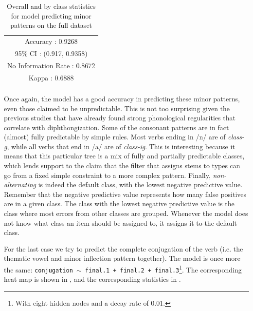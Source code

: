 \begin{table}
    \small
  \centering
  \begin{tabular}{lrrrrrr}
    \lsptoprule
    \multicolumn{7}{c}{Overall Statistics}           \\
    \midrule
    \multicolumn{7}{c}{Accuracy : 0.9268}            \\
    \multicolumn{7}{c}{95\% CI : (0.917, 0.9358)}    \\
    \multicolumn{7}{c}{No Information Rate : 0.8672} \\
    \multicolumn{7}{c}{Kappa : 0.6888}               \\
    \lspbottomrule
  \end{tabular}
  \caption{Overall and by class statistics for model predicting minor patterns on the full dataset} \label{tab:spanish-verbs-minor-v-stats-full}
\end{table}

\newpage 
Once again, the model has a good accuracy in predicting these minor patterns, even those claimed to be unpredictable. This is not too surprising given the previous studies that have already found strong phonological regularities that correlate with diphthongization. Some of the consonant patterns are in fact (almost) fully predictable by simple rules. Most verbs ending in /n/ are of \textit{class-g}, while all verbs that end in /a/ are of \textit{class-ig}. This is interesting because it means that this particular tree is a mix of fully and partially predictable classes, which lends support to the claim that the filter that assigns stems to types can go from a fixed simple constraint to a more complex pattern. Finally, \textit{non-alternating} is indeed the default class, with the lowest negative predictive value. Remember that the negative predictive value represents how many false positives are in a given class. The class with the lowest negative predictive value is the class where most errors from other classes are grouped. Whenever the model does not know what class an item should be assigned to, it assigns it to the default class.

For the last case we try to predict the complete conjugation of the verb (i.e. the thematic vowel and minor inflection pattern together). The model is once more the same: \texttt{conjugation $\sim$ final.1 + final.2 + final.3}\footnote{With eight hidden nodes and a decay rate of 0.01.}. The corresponding heat map is shown in , and the corresponding statistics in .

